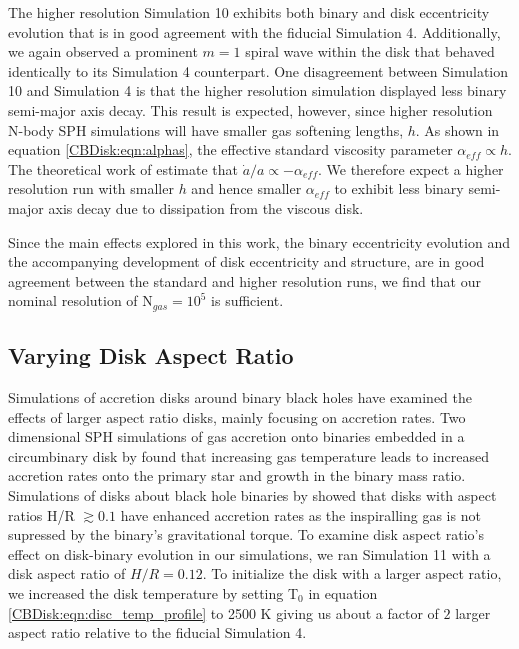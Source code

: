 The higher resolution Simulation 10 exhibits both binary and disk eccentricity evolution that is in good agreement with the fiducial Simulation 4.  
 Additionally, we again observed a prominent $m = 1$ spiral wave within the disk that behaved identically to its Simulation 4 counterpart.  One disagreement 
 between Simulation 10 and Simulation 4 is that the higher resolution simulation displayed less binary semi-major axis decay.  This result is expected, 
 however, since higher resolution N-body SPH simulations will have smaller gas softening lengths, $h$.  As shown in equation \ref{CBDisk:eqn:alphas}, the effective 
 standard viscosity parameter $\alpha_{eff} \propto h$.  The theoretical work of \citet{Artymowicz1996b,Artymowicz2000} estimate that $\dot{a}/a 
 \propto -\alpha_{eff}$.  We therefore expect a higher resolution run with smaller $h$ and hence smaller $\alpha_{eff}$ to exhibit less binary semi-major axis 
 decay due to dissipation from the viscous disk.
 
Since the main effects explored in this work, the binary eccentricity evolution and the accompanying development of disk eccentricity and structure, are 
in good agreement between the standard and higher resolution runs, we find that our nominal resolution of N$_{gas} = 10^5$ is sufficient.

	
\subsection{Varying Disk Aspect Ratio}

Simulations of accretion disks around binary black holes have examined the effects of larger aspect ratio disks, mainly focusing on accretion rates.  
Two dimensional SPH simulations of gas accretion onto binaries embedded in a circumbinary disk by \citet{Young2015} found that increasing gas temperature 
leads to increased accretion rates onto the primary star and growth in the binary mass ratio.  Simulations of disks about black hole binaries by \citet{Ragusa2016} 
showed that disks with aspect ratios H/R $\gtrsim 0.1$ have enhanced accretion rates as the inspiralling gas is not supressed by the binary's gravitational 
torque.  To examine disk aspect ratio's effect on disk-binary evolution in our simulations, we ran Simulation 11 with a disk aspect ratio of $H/R = 0.12$.  To 
initialize the disk with a larger aspect ratio, we increased the disk temperature by setting T$_0$ in equation \ref{CBDisk:eqn:disc_temp_profile} to 2500 K giving us 
about a factor of $2$ larger aspect ratio relative to the fiducial Simulation 4.

